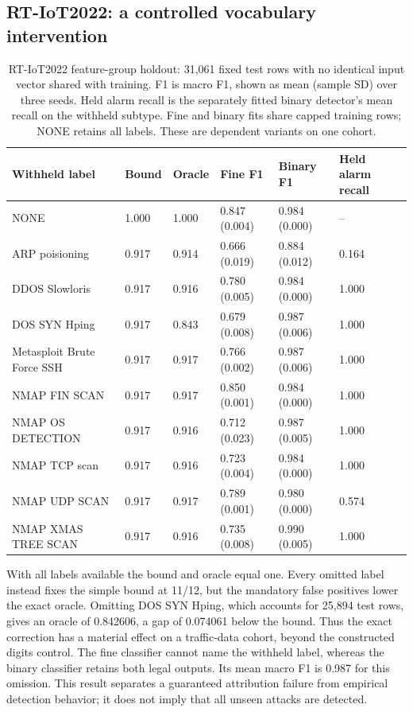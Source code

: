 \documentclass[twocolumn]{svjour3}
\begin{document}
\subsection{RT-IoT2022: a controlled vocabulary intervention}
\begin{table}[t]
\caption{RT-IoT2022 feature-group holdout: 31,061 fixed test rows with no identical input vector shared with training. F1 is macro F1, shown as mean (sample SD) over three seeds. Held alarm recall is the separately fitted binary detector's mean recall on the withheld subtype. Fine and binary fits share capped training rows; NONE retains all labels. These are dependent variants on one cohort.}\label{tab-rt}
\centering\small
\begin{tabular}{llllll}\toprule
Withheld label & Bound & Oracle & Fine F1 & Binary F1 & Held alarm recall\\
\midrule
NONE & 1.000 & 1.000 & 0.847 (0.004) & 0.984 (0.000) & --\\
ARP poisioning & 0.917 & 0.914 & 0.666 (0.019) & 0.884 (0.012) & 0.164\\
DDOS Slowloris & 0.917 & 0.916 & 0.780 (0.005) & 0.984 (0.000) & 1.000\\
DOS SYN Hping & 0.917 & 0.843 & 0.679 (0.008) & 0.987 (0.006) & 1.000\\
Metasploit Brute Force SSH & 0.917 & 0.917 & 0.766 (0.002) & 0.987 (0.006) & 1.000\\
NMAP FIN SCAN & 0.917 & 0.917 & 0.850 (0.001) & 0.984 (0.000) & 1.000\\
NMAP OS DETECTION & 0.917 & 0.916 & 0.712 (0.023) & 0.987 (0.005) & 1.000\\
NMAP TCP scan & 0.917 & 0.916 & 0.723 (0.004) & 0.984 (0.000) & 1.000\\
NMAP UDP SCAN & 0.917 & 0.917 & 0.789 (0.001) & 0.980 (0.000) & 0.574\\
NMAP XMAS TREE SCAN & 0.917 & 0.916 & 0.735 (0.008) & 0.990 (0.005) & 1.000\\
\bottomrule\end{tabular}
\end{table}


With all labels available the bound and oracle equal one. Every omitted label instead fixes the simple bound at 11/12, but the mandatory false positives lower the exact oracle. Omitting DOS SYN Hping, which accounts for 25,894 test rows, gives an oracle of 0.842606, a gap of 0.074061 below the bound. Thus the exact correction has a material effect on a traffic-data cohort, beyond the constructed digits control. The fine classifier cannot name the withheld label, whereas the binary classifier retains both legal outputs. Its mean macro F1 is 0.987 for this omission. This result separates a guaranteed attribution failure from empirical detection behavior; it does not imply that all unseen attacks are detected.
\end{document}
